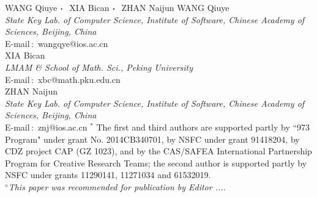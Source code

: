 \documentclass{jssc}
\def\cdd{\mbox{\boldmath$\cdot$}~}
\begin{document}
{WANG Qiuye $\cdd$ XIA Bican $\cdd$ ZHAN Naijun}%
{WANG Qiuye\\
{\it State Key Lab. of Computer Science, Institute of Software, Chinese Academy of Sciences, Beijing, China}\\
E-mail\,$:$ wangqye@ios.ac.cn\\
XIA Bican\\
{\it LMAM \& School of Math. Sci., Peking University}\\
E-mail\,$:$ xbc@math.pku.edu.cn\\
ZHAN Naijun\\
{\it State Key Lab. of Computer Science, Institute of Software, Chinese Academy of Sciences, Beijing, China}\\
E-mail\,$:$ znj@ios.ac.cn}
{$^*$ The first and third authors are supported partly by ``973 Program" under grant No. 2014CB340701, by NSFC under grant 91418204, by CDZ project CAP (GZ 1023), and by the CAS/SAFEA International Partnership Program for Creative Research Teams;
 the second author is supported partly by NSFC under grants 11290141, 11271034 and 61532019.\\
{$^\diamond${\it This paper was recommended for publication by
Editor .... }}}


\end{document}

